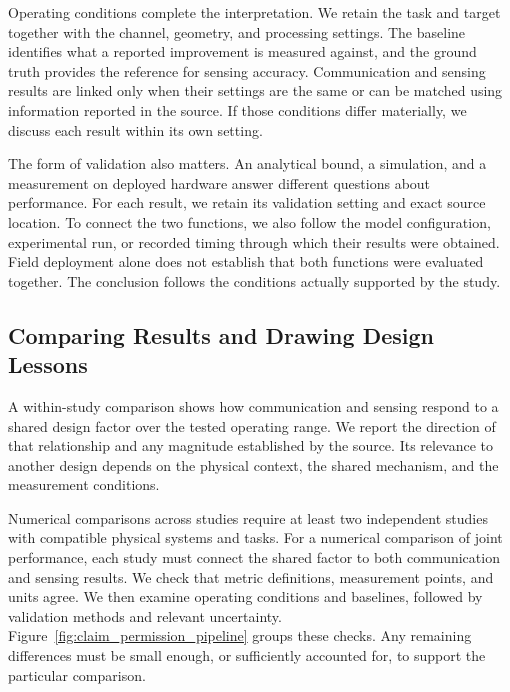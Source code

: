 Operating conditions complete the interpretation. We retain the task and
target together with the channel, geometry, and processing settings.
The baseline identifies what a reported improvement is measured against, and
the ground truth provides the reference for sensing accuracy. Communication
and sensing results are linked only when their settings are the same or can
be matched using information reported in the source. If those conditions
differ materially, we discuss each
result within its own setting.

The form of validation also matters. An analytical bound, a simulation, and a
measurement on deployed hardware answer different questions about performance.
For each result, we retain its validation setting and exact source location.
To connect the two functions, we also follow the model configuration,
experimental run, or recorded timing through which their results were obtained.
Field deployment alone does not establish that both functions were evaluated
together. The conclusion follows the conditions actually supported by the
study.

\subsection{Comparing Results and Drawing Design Lessons}

A within-study comparison shows how communication and sensing respond to a
shared design factor over the tested operating range. We report the direction
of that relationship and any magnitude established by the source. Its
relevance to another design depends on the physical context, the shared
mechanism, and the measurement conditions.

Numerical comparisons across studies require at least two independent studies
with compatible physical systems and tasks. For a numerical comparison of
joint performance, each study must connect the shared factor to both
communication and sensing results. We check that metric definitions,
measurement points, and units agree. We then examine operating conditions and
baselines, followed by validation methods and relevant uncertainty.
Figure~\ref{fig:claim_permission_pipeline} groups these checks.
Any remaining differences must be small enough, or sufficiently accounted
for, to support the particular comparison.

